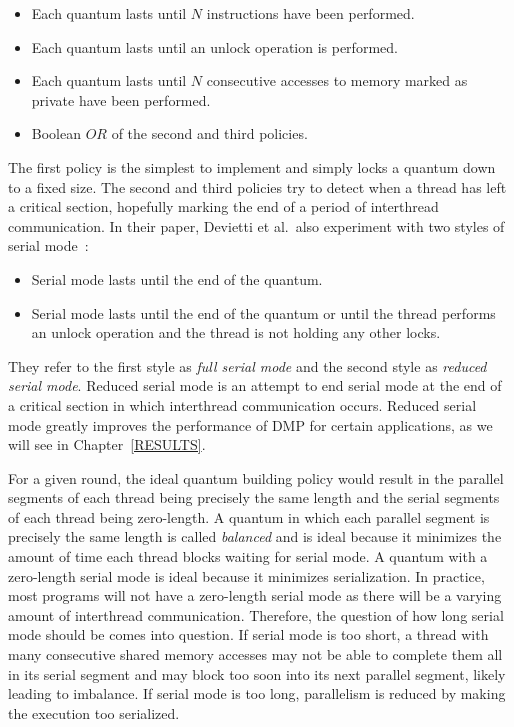 \begin{itemize}
\item Each quantum lasts until $N$ instructions have been performed.

\item Each quantum lasts until an unlock operation is performed.

\item Each quantum lasts until $N$ consecutive accesses to memory
  marked as private have been performed.

\item Boolean $OR$ of the second and third policies.
\end{itemize}

The first policy is the simplest to implement and simply locks a
quantum down to a fixed size.  The second and third policies try to
detect when a thread has left a critical section, hopefully marking
the end of a period of interthread communication.  In their paper,
Devietti et al.\ also experiment with two styles of serial
mode~\cite{dmp}:

\begin{itemize}
\item Serial mode lasts until the end of the quantum.

\item Serial mode lasts until the end of the quantum or until the
  thread performs an unlock operation and the thread is not holding
  any other locks.
\end{itemize}

They refer to the first style as \emph{full serial mode} and the
second style as \emph{reduced serial mode}.  Reduced serial mode is an
attempt to end serial mode at the end of a critical section in which
interthread communication occurs.  Reduced serial mode greatly
improves the performance of DMP for certain applications, as we will
see in Chapter~\ref{RESULTS}.

For a given round, the ideal quantum building policy would result in
the parallel segments of each thread being precisely the same length
and the serial segments of each thread being zero-length.  A quantum
in which each parallel segment is precisely the same length is called
\emph{balanced} and is ideal because it minimizes the amount of time
each thread blocks waiting for serial mode.  A quantum with a
zero-length serial mode is ideal because it minimizes serialization.
In practice, most programs will not have a zero-length serial mode as
there will be a varying amount of interthread communication.
Therefore, the question of how long serial mode should be comes into
question.  If serial mode is too short, a thread with many consecutive
shared memory accesses may not be able to complete them all in its
serial segment and may block too soon into its next parallel segment,
likely leading to imbalance.  If serial mode is too long, parallelism
is reduced by making the execution too serialized.

